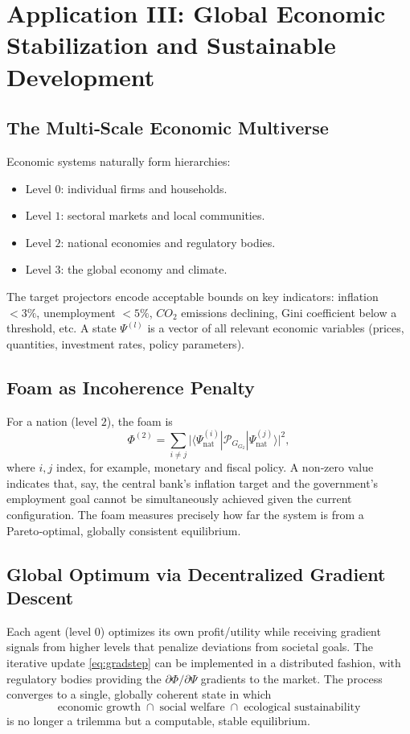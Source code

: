 \documentclass[11pt,a4paper]{article}
\theoremstyle{definition}
\newcommand{\pG}{\mathcal{P}_{\!G}}
\newcommand{\Foam}{\Phi}
\begin{document}
\section{Application III: Global Economic Stabilization and Sustainable Development}

\subsection{The Multi‑Scale Economic Multiverse}

Economic systems naturally form hierarchies:
\begin{itemize}
    \item Level $0$: individual firms and households.
    \item Level $1$: sectoral markets and local communities.
    \item Level $2$: national economies and regulatory bodies.
    \item Level $3$: the global economy and climate.
\end{itemize}

The target projectors encode acceptable bounds on key indicators: inflation $<3\%$, unemployment $<5\%$, $CO_2$ emissions declining, Gini coefficient below a threshold, etc. A state $\Psi^{(l)}$ is a vector of all relevant economic variables (prices, quantities, investment rates, policy parameters).

\subsection{ Foam as Incoherence Penalty}

For a nation (level $2$), the foam is
\[
\Foam^{(2)} = \sum_{i\neq j} \bigl| \langle \Psi^{(i)}_{\text{nat}} | \pG_{G_2} | \Psi^{(j)}_{\text{nat}} \rangle \bigr|^2,
\]
where $i,j$ index, for example, monetary and fiscal policy. A non‑zero value indicates that, say, the central bank’s inflation target and the government’s employment goal cannot be simultaneously achieved given the current configuration. The foam measures precisely how far the system is from a Pareto‑optimal, globally consistent equilibrium.

\subsection{ Global Optimum via Decentralized Gradient Descent}

Each agent (level $0$) optimizes its own profit/utility while receiving gradient signals from higher levels that penalize deviations from societal goals. The iterative update \eqref{eq:gradstep} can be implemented in a distributed fashion, with regulatory bodies providing the $\partial\Foam/\partial\Psi$ gradients to the market. The process converges to a single, globally coherent state in which
\[
\text{economic growth} \;\cap\; \text{social welfare} \;\cap\; \text{ecological sustainability}
\]
is no longer a trilemma but a computable, stable equilibrium.
\end{document}
